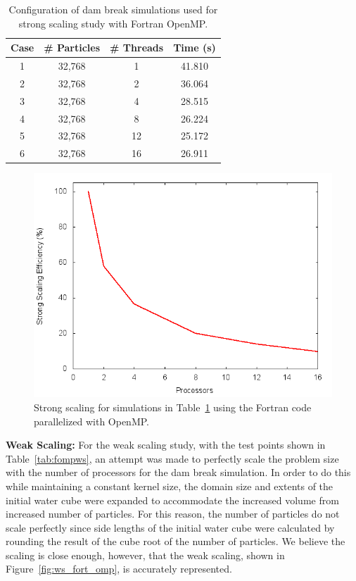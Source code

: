 \documentclass{scrartcl}
\begin{document}
      \begin{table}
      	\begin{center}
      		\begin{tabular}{| c | c | c | c |}
      			\hline
      			Case & \# Particles & \# Threads & Time (s) \\ \hline		  		
      			1 & 32,768 &  1 & 41.810 \\ \hline		  		
      			2 & 32,768 &  2 & 36.064 \\ \hline		  		
      			3 & 32,768 &  4 & 28.515 \\ \hline		  		
      			4 & 32,768 &  8 & 26.224 \\ \hline		  		
      			5 & 32,768 & 12 & 25.172 \\ \hline		  		
      			6 & 32,768 & 16 & 26.911 \\ \hline		  		
      		\end{tabular}
      		\caption{Configuration of dam break simulations used for strong scaling study with Fortran OpenMP.}
      		\label{tab:fompss}
      	\end{center}
      \end{table}
  \begin{figure}
  	\begin{center}
	  	\includegraphics[width=0.6\columnwidth]{./fort_scaling/ss.png}
	  	\caption{Strong scaling for simulations in Table~\ref{tab:fompss} using the Fortran code parallelized with OpenMP.}
		\label{fig:ss_fort_omp}
  	\end{center}
  \end{figure}
  
  
  \textbf{Weak Scaling:}  
  For the weak scaling study, with the test points shown in Table~\ref{tab:fompws}, an attempt was made to perfectly scale the problem size with the number of processors for the dam break simulation. In order to do this while maintaining a constant kernel size, the domain size and extents of the initial water cube were expanded to accommodate the increased volume from increased number of particles. For this reason, the number of particles do not scale perfectly since side lengths of the initial water cube were calculated by rounding the result of the cube root of the number of particles. We believe the scaling is close enough, however, that the weak scaling, shown in Figure~\ref{fig:ws_fort_omp}, is accurately represented.
  
\end{document}
